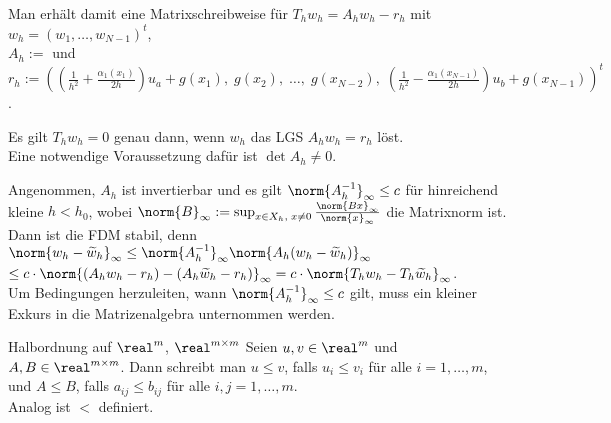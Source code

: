 \begin{Bem}
    Man erhält damit eine Matrixschreibweise für $T_h w_h = A_h w_h - r_h$ mit
    $w_h = (w_1, \dotsc, w_{N-1})^t$,\\
    $A_h :=$  und\\
    $r_h :=
    \left(\left(\frac{1}{h^2} + \frac{\alpha_1(x_1)}{2h}\right) u_a + g(x_1),\;
    g(x_2),\; \dotsc,\; g(x_{N-2}),\;
    \left(\frac{1}{h^2} - \frac{\alpha_1(x_{N-1})}{2h}\right) u_b +
    g(x_{N-1})\right)^t$.

    Es gilt $T_h w_h = 0$ genau dann, wenn $w_h$ das LGS $A_h w_h = r_h$
    löst.\\
    Eine notwendige Voraussetzung dafür ist $\det A_h \not= 0$.
\end{Bem}

\linie

\begin{Bem}
    Angenommen, $A_h$ ist invertierbar und es gilt
    $\norm{A_h^{-1}}_\infty \le c$ für hinreichend kleine $h < h_0$,
    wobei $\norm{B}_\infty :=
    \sup_{x \in X_h,\; x \not= 0} \frac{\norm{Bx}_\infty}{\norm{x}_\infty}$
    die Matrixnorm ist.\\
    Dann ist die FDM stabil, denn
    $\norm{w_h - \widetilde{w}_h}_\infty \le
    \norm{A_h^{-1}}_\infty \norm{A_h (w_h - \widetilde{w}_h)}_\infty$\\
    $\le c \cdot \norm{(A_h w_h - r_h) - (A_h \widetilde{w}_h - r_h)}_\infty =
    c \cdot \norm{T_h w_h - T_h \widetilde{w}_h}_\infty$.\\
    Um Bedingungen herzuleiten, wann $\norm{A_h^{-1}}_\infty \le c$ gilt,
    muss ein kleiner Exkurs in die Matrizenalgebra unternommen werden.
\end{Bem}

\begin{Def}{Halbordnung auf $\real^m$, $\real^{m \times m}$}
    Seien $u, v \in \real^m$ und $A, B \in \real^{m \times m}$.
    Dann schreibt man $u \le v$, falls $u_i \le v_i$
    für alle $i = 1, \dotsc, m$, und $A \le B$, falls
    $a_{ij} \le b_{ij}$ für alle $i, j = 1, \dotsc, m$.\\
    Analog ist $<$ definiert.
\end{Def}

